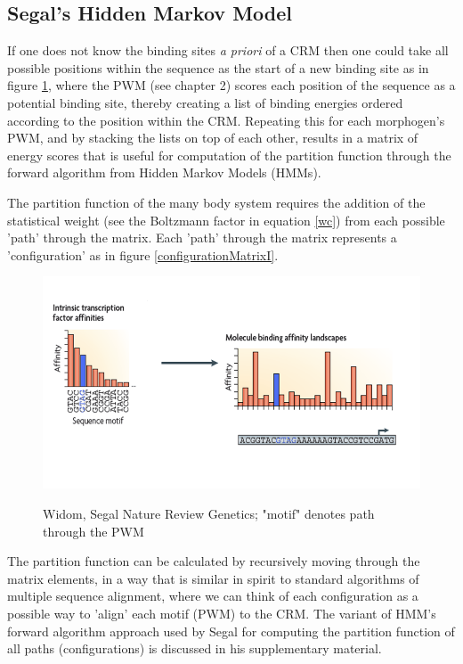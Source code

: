 \subsection{Segal's Hidden Markov Model}     

 If one does not know the binding sites \textit{a priori} of a CRM then one could take all possible positions within the sequence as the start of a new binding site as in figure \ref{sb}, where the PWM (see chapter 2) scores each position of the sequence as a potential binding site, thereby creating a list of binding energies ordered according to the position within the CRM.  Repeating this for each morphogen's PWM, and by stacking the lists on top of each other, results in a matrix of energy scores that is useful for computation of the partition function through the forward algorithm from Hidden Markov Models (HMMs).  
 
 The partition function of the many body system requires the addition of the statistical weight (see the Boltzmann factor in equation \ref{wc}) from each possible 'path' through the matrix.  Each 'path' through the matrix represents a 'configuration' as in figure \ref{configurationMatrixI}.
\begin{figure}
  \includegraphics[width=1\textwidth]{segalblandscape}\\
  \caption{Widom, Segal Nature Review Genetics; "motif" denotes path through the PWM\cite{pmid19506578}}\label{sb}
\end{figure}
The partition function can be calculated by recursively moving through the matrix elements, in a way that is similar in spirit to standard algorithms of multiple sequence alignment\cite{BSA}, where we can think of each configuration as a possible way to 'align' each motif (PWM) to the CRM.  The variant of HMM's forward algorithm approach used by Segal for computing the partition function of all paths (configurations) is discussed in his supplementary material. 
